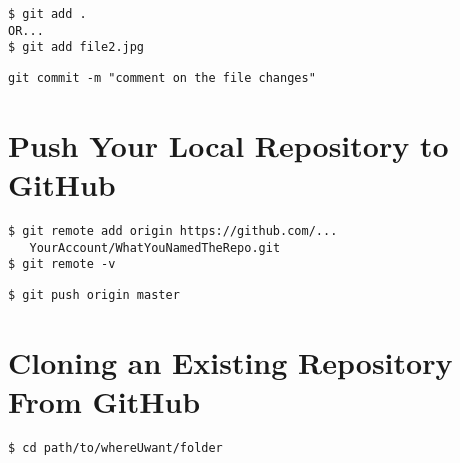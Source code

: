 \documentclass{tufte-handout}
\begin{document}
\begin{shaded}
\begin{verbatim}
$ git add .
OR...
$ git add file2.jpg
\end{verbatim}
\end{shaded}

\begin{shaded}
\begin{verbatim}
git commit -m "comment on the file changes"
\end{verbatim}
\end{shaded}



\newpage

\section{Push Your Local Repository to GitHub}

\begin{shaded}
\begin{verbatim}
$ git remote add origin https://github.com/...
   YourAccount/WhatYouNamedTheRepo.git
$ git remote -v
\end{verbatim}
\end{shaded}

\begin{shaded}
\begin{verbatim}
$ git push origin master
\end{verbatim}
\end{shaded}




\section{Cloning an Existing Repository From GitHub }


\begin{shaded}
\begin{verbatim}
$ cd path/to/whereUwant/folder
\end{verbatim}
\end{shaded}
\end{document}
